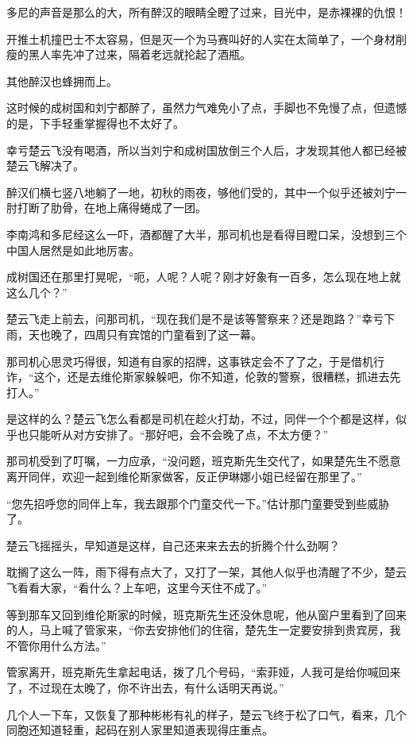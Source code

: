 多尼的声音是那么的大，所有醉汉的眼睛全瞪了过来，目光中，是赤裸裸的仇恨！

开推土机撞巴士不太容易，但是灭一个为马赛叫好的人实在太简单了，一个身材削瘦的黑人率先冲了过来，隔着老远就抡起了酒瓶。

其他醉汉也蜂拥而上。

这时候的成树国和刘宁都醉了，虽然力气难免小了点，手脚也不免慢了点，但遗憾的是，下手轻重掌握得也不太好了。

幸亏楚云飞没有喝酒，所以当刘宁和成树国放倒三个人后，才发现其他人都已经被楚云飞解决了。

醉汉们横七竖八地躺了一地，初秋的雨夜，够他们受的，其中一个似乎还被刘宁一肘打断了肋骨，在地上痛得蜷成了一团。

李南鸿和多尼经这么一吓，酒都醒了大半，那司机也是看得目瞪口呆，没想到三个中国人居然是如此地厉害。

成树国还在那里打晃呢，“呃，人呢？人呢？刚才好象有一百多，怎么现在地上就这么几个？”

楚云飞走上前去，问那司机，“现在我们是不是该等警察来？还是跑路？”幸亏下雨，天也晚了，四周只有宾馆的门童看到了这一幕。

那司机心思灵巧得很，知道有自家的招牌，这事铁定会不了了之，于是借机行诈，“这个，还是去维伦斯家躲躲吧，你不知道，伦敦的警察，很糟糕，抓进去先打人。”

是这样的么？楚云飞怎么看都是司机在趁火打劫，不过，同伴一个个都是这样，似乎也只能听从对方安排了。“那好吧，会不会晚了点，不太方便？”

那司机受到了叮嘱，一力应承，“没问题，班克斯先生交代了，如果楚先生不愿意离开同伴，欢迎一起到维伦斯家做客，反正伊琳娜小姐已经留在那里了。”

“您先招呼您的同伴上车，我去跟那个门童交代一下。”估计那门童要受到些威胁了。

楚云飞摇摇头，早知道是这样，自己还来来去去的折腾个什么劲啊？

耽搁了这么一阵，雨下得有点大了，又打了一架，其他人似乎也清醒了不少，楚云飞看看大家，“看什么？上车吧，这里今天住不成了。”

等到那车又回到维伦斯家的时候，班克斯先生还没休息呢，他从窗户里看到了回来的人，马上喊了管家来，“你去安排他们的住宿，楚先生一定要安排到贵宾房，我不管你用什么方法。”

管家离开，班克斯先生拿起电话，拨了几个号码，“索菲娅，人我可是给你喊回来了，不过现在太晚了，你不许出去，有什么话明天再说。”

几个人一下车，又恢复了那种彬彬有礼的样子，楚云飞终于松了口气，看来，几个同胞还知道轻重，起码在别人家里知道表现得庄重点。

